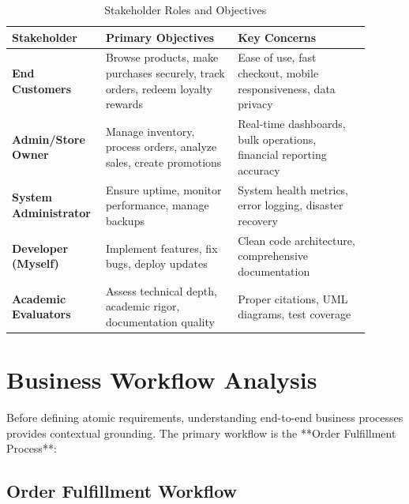 \begin{table}[H]
\centering
\caption{Stakeholder Roles and Objectives}
\label{tab:stakeholders}
\begin{tabular}{@{}p{0.20\linewidth}p{0.35\linewidth}p{0.35\linewidth}@{}}
\toprule
\textbf{Stakeholder} & \textbf{Primary Objectives} & \textbf{Key Concerns} \\
\midrule
\textbf{End Customers} & Browse products, make purchases securely, track orders, redeem loyalty rewards & Ease of use, fast checkout, mobile responsiveness, data privacy \\
\textbf{Admin/Store Owner} & Manage inventory, process orders, analyze sales, create promotions & Real-time dashboards, bulk operations, financial reporting accuracy \\
\textbf{System Administrator} & Ensure uptime, monitor performance, manage backups & System health metrics, error logging, disaster recovery \\
\textbf{Developer (Myself)} & Implement features, fix bugs, deploy updates & Clean code architecture, comprehensive documentation \\
\textbf{Academic Evaluators} & Assess technical depth, academic rigor, documentation quality & Proper citations, UML diagrams, test coverage \\
\bottomrule
\end{tabular}
\end{table}

\section{Business Workflow Analysis}

Before defining atomic requirements, understanding end-to-end business processes provides contextual grounding. The primary workflow is the **Order Fulfillment Process**:

\subsection{Order Fulfillment Workflow}

